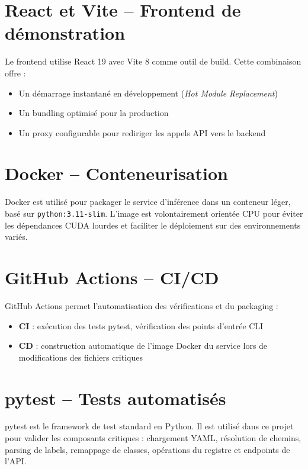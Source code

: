 \documentclass[a4paper,12pt]{report}
\begin{document}
\section{React et Vite -- Frontend de d\'emonstration}
Le frontend utilise React 19 avec Vite 8 comme outil de build. Cette combinaison offre :
\begin{itemize}
\item Un d\'emarrage instantan\'e en d\'eveloppement (\textit{Hot Module Replacement})
\item Un bundling optimis\'e pour la production
\item Un proxy configurable pour rediriger les appels API vers le backend
\end{itemize}

\section{Docker -- Conteneurisation}
Docker est utilis\'e pour packager le service d'inf\'erence dans un conteneur l\'eger, bas\'e sur \texttt{python:3.11-slim}. L'image est volontairement orient\'ee CPU pour \'eviter les d\'ependances CUDA lourdes et faciliter le d\'eploiement sur des environnements vari\'es.

\section{GitHub Actions -- CI/CD}
GitHub Actions permet l'automatisation des v\'erifications et du packaging :
\begin{itemize}
\item \textbf{CI} : ex\'ecution des tests pytest, v\'erification des points d'entr\'ee CLI
\item \textbf{CD} : construction automatique de l'image Docker du service lors de modifications des fichiers critiques
\end{itemize}

\section{pytest -- Tests automatis\'es}
pytest est le framework de test standard en Python. Il est utilis\'e dans ce projet pour valider les composants critiques : chargement YAML, r\'esolution de chemins, parsing de labels, remappage de classes, op\'erations du registre et endpoints de l'API.
\end{document}
